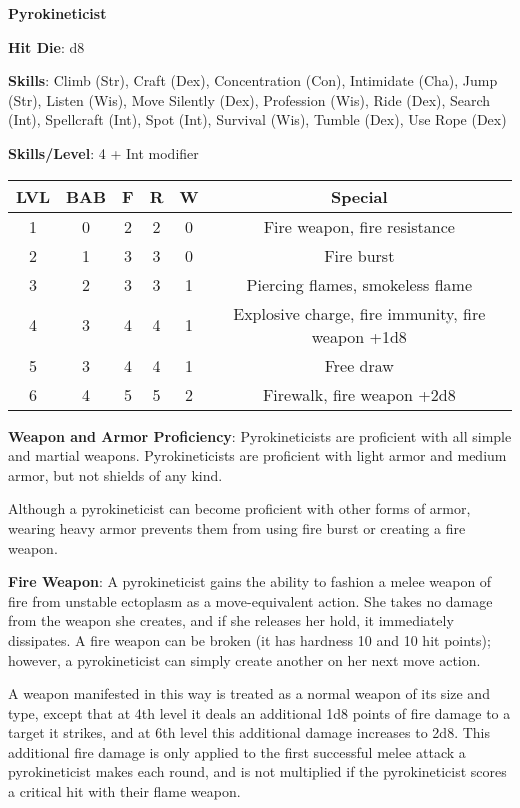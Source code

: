 \textbf{\huge{Pyrokineticist}}

\textbf{Hit Die}: d8

\textbf{Skills}: Climb (Str), Craft (Dex), Concentration (Con), Intimidate (Cha), Jump (Str), Listen (Wis), Move Silently (Dex), Profession (Wis), Ride (Dex), Search (Int), Spellcraft (Int), Spot (Int), Survival (Wis), Tumble (Dex), Use Rope (Dex)

\textbf{Skills/Level}: 4 + Int modifier

\begin{center}
\begin{adjustwidth}{-4cm}{}
\begin{small}
\begin{tabular}{| c | c | c | c | c | c |}
\hline
LVL &BAB &F &R &W &Special \\
\hline
1 &0 &2 &2 &0 &Fire weapon, fire resistance \\
2 &1 &3 &3 &0 &Fire burst \\
3 &2 &3 &3 &1 &Piercing flames, smokeless flame \\
4 &3 &4 &4 &1 &Explosive charge, fire immunity, fire weapon +1d8 \\
5 &3 &4 &4 &1 &Free draw \\
6 &4 &5 &5 &2 &Firewalk, fire weapon +2d8 \\
\hline
\end{tabular}
\end{small}
\end{adjustwidth}
\end{center}

\textbf{Weapon and Armor Proficiency}: Pyrokineticists are proficient with all simple and martial weapons. Pyrokineticists are proficient with light armor and medium armor, but not shields of any kind.

Although a pyrokineticist can become proficient with other forms of armor, wearing heavy armor prevents them from using fire burst or creating a fire weapon.

\textbf{Fire Weapon}: A pyrokineticist gains the ability to fashion a melee weapon of fire from unstable ectoplasm as a move-equivalent action. She takes no damage from the weapon she creates, and if she releases her hold, it immediately dissipates. A fire weapon can be broken (it has hardness 10 and 10 hit points); however, a pyrokineticist can simply create another on her next move action.

A weapon manifested in this way is treated as a normal weapon of its size and type, except that at 4th level it deals an additional 1d8 points of fire damage to a target it strikes, and at 6th level this additional damage increases to 2d8. This additional fire damage is only applied to the first successful melee attack a pyrokineticist makes each round, and is not multiplied if the pyrokineticist scores a critical hit with their flame weapon. 

